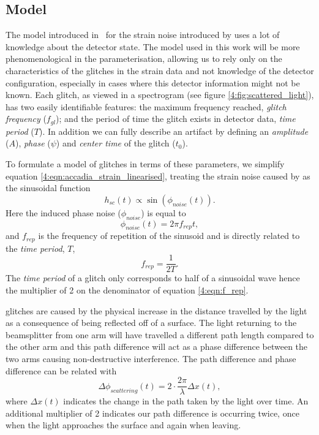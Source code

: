 \subsection{Model}

The model introduced in~\cite{TAccadia:2010} for the \gw{} strain noise introduced by \scl{} uses a lot of knowledge about the detector state. The model used in this work will be more phenomenological in the parameterisation, allowing us to rely only on the characteristics of the glitches in the strain data and not knowledge of the detector configuration, especially in cases where this detector information might not be known. Each \scl{} glitch, as viewed in a spectrogram (see figure \ref{4:fig:scattered_light}), has two easily identifiable features: the maximum frequency reached, \emph{glitch frequency} ($f_{gl}$); and the period of time the glitch exists in detector data, \emph{time period} ($T$).  In addition we can fully describe an artifact by defining an \emph{amplitude} ($A$), \emph{phase} ($\psi$) and \emph{center time} of the glitch ($t_0$).

To formulate a model of \scl{} glitches in terms of these parameters, we simplify equation \ref{4:eqn:accadia_strain_linearised}, treating the strain noise caused by \scl{} as the sinusoidal function
%
\begin{equation}
  h_{sc}(t) \propto \sin(\phi_{noise}(t)).
  \label{4:eqn:h_sc_initial}
\end{equation}
%
Here the induced phase noise ($\phi_{noise}$) is equal to 
%
\begin{equation}
    \phi_{noise}(t) = 2 \pi f_{rep} t,
     \label{4:eqn:phi_noise}
\end{equation}
%
and $f_{rep}$ is the frequency of repetition of the sinusoid and is directly related to the \emph{time period}, $T$,
%
\begin{equation}
  f_{rep} = \frac{1}{2 T}.
  \label{4:eqn:f_rep}
\end{equation}
%
The \emph{time period} of a \scl{} glitch only corresponds to half of a sinusoidal wave hence the multiplier of 2 on the denominator of equation \ref{4:eqn:f_rep}.

\Scl{} glitches are caused by the physical increase in the distance travelled by the light as a consequence of being reflected off of a surface. The light returning to the beamsplitter from one arm will have travelled a different path length compared to the other arm and this path difference will act as a phase difference between the two arms causing non-destructive interference. The path difference and phase difference can be related with
%
\begin{equation}
  \Delta \phi_{scattering}(t) = 2 \cdot \frac{2 \pi}{\lambda} \Delta x(t),
  \label{4:eqn:delta_phi_scat}
\end{equation}
%
where $\Delta x(t)$ indicates the change in the path taken by the light over time. An additional multiplier of 2 indicates our path difference is occurring twice, once when the light approaches the surface and again when leaving.

